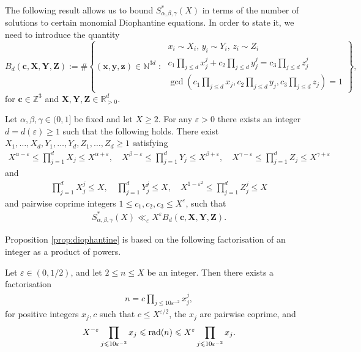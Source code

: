 The following result allows us to  bound $S^*_{\alpha,\beta,\gamma}(X)$
in terms of the  number of solutions to certain monomial Diophantine equations. In order to state it, we need to introduce  the quantity
\begin{equation}\label{eq:Bk}
B_d(\mathbf{c},\mathbf{X},\mathbf{Y},\mathbf{Z})  :=  \#\left\{(\mathbf{x},\mathbf{y},\mathbf{z})\in \mathbb{N}^{3d}\;:\;
\begin{array}{l}
x_i\sim X_i,\,y_i\sim Y_i,\,z_i\sim Z_i \\
c_1\prod_{j\leq d}x_j^j+c_2\prod_{j\leq d}y_j^j=c_3\prod_{j\leq d}z_j^j\\
\gcd(c_1\prod_{j\leq d}x_j,c_2\prod_{j\leq d}y_j ,
c_3\prod_{j\leq d}z_j)=1
\end{array}
\right\},
\end{equation}
for $\mathbf{c}\in \mathbb{Z}^3$ and $\mathbf{X},\mathbf{Y},\mathbf{Z}\in \mathbb{R}_{>0}^{d}$.




\begin{proposition}\label{prop:diophantine}
Let $\alpha,\beta,\gamma\in (0,1]$ be fixed and let $X\geq 2$. For any $\varepsilon>0$ there exists an integer $d=d(\varepsilon)\geq 1$ such that the following holds.
There exist $X_1,\ldots, X_d,Y_1,\ldots, Y_d, Z_1,\ldots, Z_d\geq 1$ satisfying
\begin{align}\label{eq:xiyizi_1}
X^{\alpha-\varepsilon}\leq \prod_{j=1}^dX_j\leq X^{\alpha+\varepsilon},\quad X^{\beta-\varepsilon}\leq\prod_{j=1}^dY_j\leq X^{\beta+\varepsilon},\quad X^{\gamma-\varepsilon}\leq\prod_{j=1}^dZ_j\leq X^{\gamma+\varepsilon}
\end{align}
and
\begin{align}\label{eq:xiyizi_2}
\prod_{j=1}^d X_j^j \leq X, \quad  \prod_{j=1}^d Y_j^j\leq X,\quad X^{1-\varepsilon^2}\leq \prod_{j=1}^d Z_j^j\leq X
\end{align}
and pairwise coprime integers $1\leq c_1,c_2,c_3\leq X^{\varepsilon}$, such that
\begin{align*}
S^*_{\alpha,\beta,\gamma}(X)  \ll_{\varepsilon} X^{\varepsilon}B_d(\mathbf{c},\mathbf{X},\mathbf{Y},\mathbf{Z}).
\end{align*}
\end{proposition}


Proposition \ref{prop:diophantine} is based on the following factorisation of an integer as a product of powers.


\begin{lemma}\label{le_factor} Let $\varepsilon\in (0,1/2)$, and let $2\leq n\leq X$ be an integer. Then there exists a factorisation
\begin{align*}
n=c\prod_{j\leq 10\varepsilon^{-2}}x_j^{j},
\end{align*}
for positive integers $x_j,c$ such that $c\leq X^{\varepsilon/2}$, the  $x_j$ are pairwise coprime, and \begin{align*}
X^{-\varepsilon}\prod_{j\leqslant 10\varepsilon^{-2}}x_j  \leqslant  \operatorname{rad}(n)  \leqslant  X^{\varepsilon}\prod_{j\leqslant 10\varepsilon^{-2}}x_j.
\end{align*}
\end{lemma}

